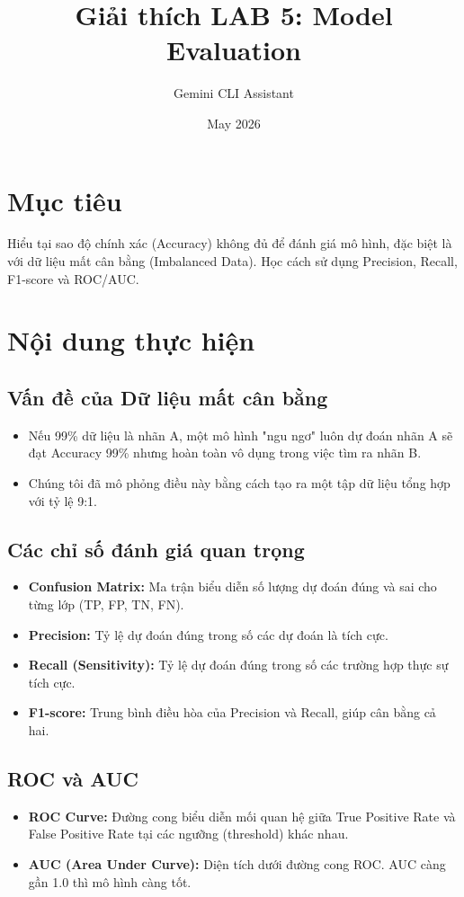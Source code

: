 \documentclass{article}
\title{Giải thích LAB 5: Model Evaluation}
\author{Gemini CLI Assistant}
\date{May 2026}
\begin{document}
\maketitle

\section{Mục tiêu}
Hiểu tại sao độ chính xác (Accuracy) không đủ để đánh giá mô hình, đặc biệt là với dữ liệu mất cân bằng (Imbalanced Data). Học cách sử dụng Precision, Recall, F1-score và ROC/AUC.

\section{Nội dung thực hiện}

\subsection{Vấn đề của Dữ liệu mất cân bằng}
\begin{itemize}
    \item Nếu 99\% dữ liệu là nhãn A, một mô hình "ngu ngơ" luôn dự đoán nhãn A sẽ đạt Accuracy 99\% nhưng hoàn toàn vô dụng trong việc tìm ra nhãn B.
    \item Chúng tôi đã mô phỏng điều này bằng cách tạo ra một tập dữ liệu tổng hợp với tỷ lệ 9:1.
\end{itemize}

\subsection{Các chỉ số đánh giá quan trọng}
\begin{itemize}
    \item \textbf{Confusion Matrix:} Ma trận biểu diễn số lượng dự đoán đúng và sai cho từng lớp (TP, FP, TN, FN).
    \item \textbf{Precision:} Tỷ lệ dự đoán đúng trong số các dự đoán là tích cực.
    \item \textbf{Recall (Sensitivity):} Tỷ lệ dự đoán đúng trong số các trường hợp thực sự tích cực.
    \item \textbf{F1-score:} Trung bình điều hòa của Precision và Recall, giúp cân bằng cả hai.
\end{itemize}

\subsection{ROC và AUC}
\begin{itemize}
    \item \textbf{ROC Curve:} Đường cong biểu diễn mối quan hệ giữa True Positive Rate và False Positive Rate tại các ngưỡng (threshold) khác nhau.
    \item \textbf{AUC (Area Under Curve):} Diện tích dưới đường cong ROC. AUC càng gần 1.0 thì mô hình càng tốt.
\end{itemize}
\end{document}
